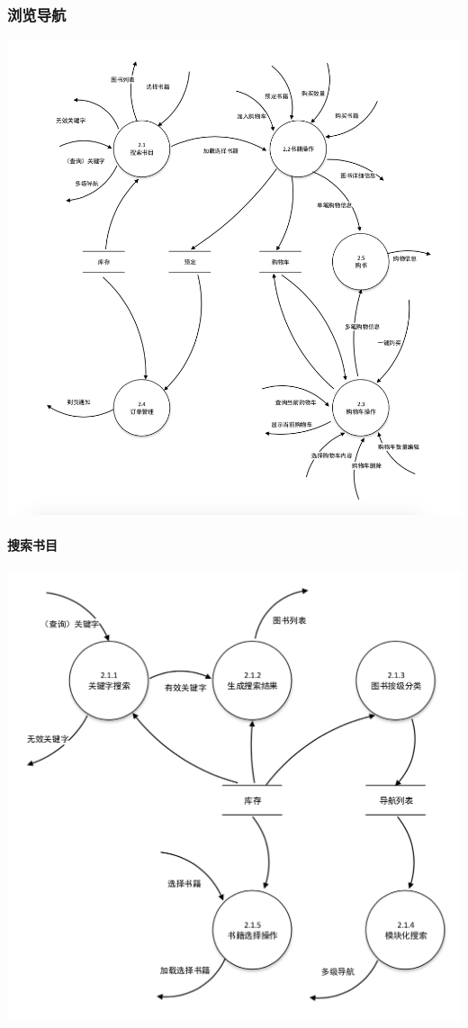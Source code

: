 \subsubsection{浏览导航}
\begin{center}
    \includegraphics[width=1\linewidth]{img/2.png}
\end{center}
\paragraph{搜索书目}
\begin{center}
    \includegraphics[width=1\linewidth]{img/2.1.png}
\end{center}
